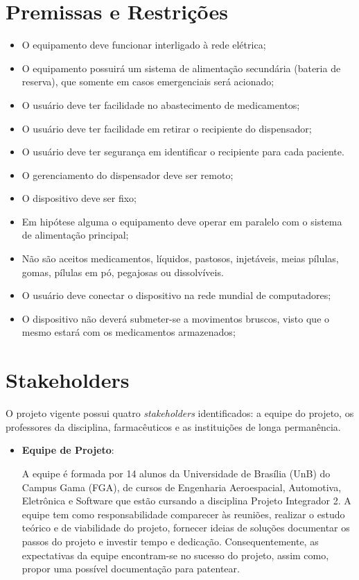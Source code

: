 \begin{apendicesenv}
\section{Premissas e Restrições}

\begin{itemize}
    \item O equipamento deve funcionar interligado à rede elétrica;
    \item O equipamento possuirá um sistema de alimentação secundária (bateria de reserva), que somente em casos emergenciais será acionado;
    \item O usuário deve ter facilidade no abastecimento de medicamentos;
    \item O usuário deve ter facilidade em retirar o recipiente do dispensador;
    \item O usuário deve ter segurança em identificar o recipiente para cada paciente. 
    \item O gerenciamento do dispensador deve ser remoto;
    \item O dispositivo deve ser fixo;
    \item Em hipótese alguma o equipamento deve operar em paralelo com o sistema de alimentação principal;
    \item Não são aceitos medicamentos, líquidos, pastosos, injetáveis, meias pílulas, gomas, pílulas em pó, pegajosas ou dissolvíveis.
    \item O usuário deve conectar o dispositivo na rede mundial de computadores;
    \item O dispositivo não deverá submeter-se a movimentos bruscos, visto que o mesmo estará com os medicamentos armazenados;
\end{itemize}

\section{Stakeholders}
O projeto vigente possui quatro \textit{stakeholders} identificados: a equipe do projeto, os professores da disciplina, farmacêuticos e as instituições de longa permanência.

\begin{itemize}
\item \textbf{Equipe de Projeto}:

A equipe é formada por 14 alunos da Universidade de Brasília (UnB) do Campus Gama (FGA), de cursos de Engenharia Aeroespacial, Automotiva, Eletrônica e Software que estão cursando a disciplina Projeto Integrador 2. A equipe tem como responsabilidade  comparecer às reuniões, realizar o estudo teórico e de viabilidade do projeto, fornecer ideias de soluções documentar os passos do projeto e investir tempo e dedicação. Consequentemente, as expectativas da equipe encontram-se no sucesso do projeto, assim como, propor uma possível documentação para patentear.


\end{itemize}
\end{apendicesenv}
